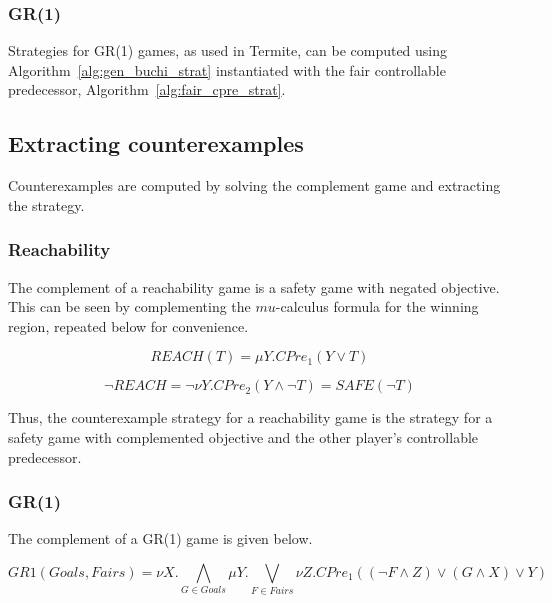 \subsubsection{GR(1)}

Strategies for GR(1) games, as used in Termite, can be computed using Algorithm~\ref{alg:gen_buchi_strat} instantiated with the fair controllable predecessor, Algorithm~\ref{alg:fair_cpre_strat}.

\subsection{Extracting counterexamples}

Counterexamples are computed by solving the complement game and extracting the strategy.

\subsubsection{Reachability}

The complement of a reachability game is a safety game with negated objective. This can be seen by complementing the $mu$-calculus formula for the winning region, repeated below for convenience.

\begin{equation}
    \mathit{REACH}(T) = \mu Y. CPre_1(Y \vee T)
\end{equation}

\begin{equation}
    \neg\mathit{REACH} = \neg\nu Y. CPre_2(Y \wedge \neg T) = \mathit{SAFE}(\neg T) 
\end{equation}

Thus, the counterexample strategy for a reachability game is the strategy for a safety game with complemented objective and the other player's controllable predecessor. 

\subsubsection{GR(1)}

The complement of a GR(1) game is given below.

\begin{equation}
    GR1(Goals, Fairs) = \nu X. \bigwedge_{G \in Goals} \mu Y. \bigvee_{F \in Fairs} \nu Z. CPre_1((\neg F \wedge Z) \vee (G \wedge X) \vee Y)
\end{equation}

